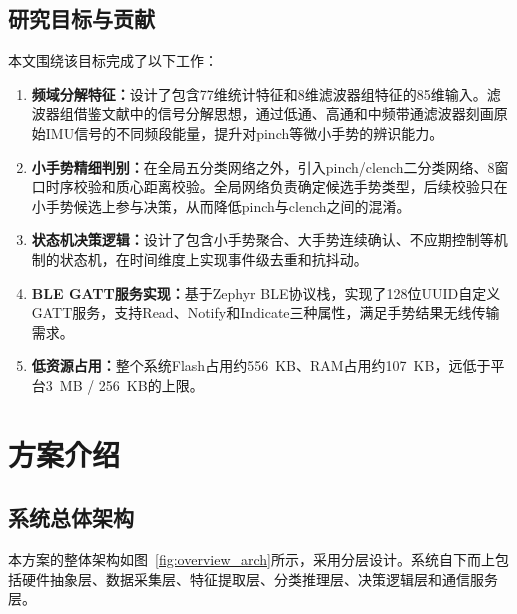 \documentclass[lettersize,journal]{IEEEtran}
\begin{document}
\subsection{研究目标与贡献}

本文围绕该目标完成了以下工作：

\begin{enumerate}[leftmargin=*]
    \item \textbf{频域分解特征：}设计了包含77维统计特征和8维滤波器组特征的85维输入。滤波器组借鉴文献\cite{xu2022enabling}中的信号分解思想，通过低通、高通和中频带通滤波器刻画原始IMU信号的不同频段能量，提升对pinch等微小手势的辨识能力。

    \item \textbf{小手势精细判别：}在全局五分类网络之外，引入pinch/clench二分类网络、8窗口时序校验和质心距离校验。全局网络负责确定候选手势类型，后续校验只在小手势候选上参与决策，从而降低pinch与clench之间的混淆。

    \item \textbf{状态机决策逻辑：}设计了包含小手势聚合、大手势连续确认、不应期控制等机制的状态机，在时间维度上实现事件级去重和抗抖动。

    \item \textbf{BLE GATT服务实现：}基于Zephyr BLE协议栈，实现了128位UUID自定义GATT服务，支持Read、Notify和Indicate三种属性，满足手势结果无线传输需求\cite{zephyr_ble}。

    \item \textbf{低资源占用：}整个系统Flash占用约556~KB、RAM占用约107~KB，远低于平台3~MB / 256~KB的上限。
\end{enumerate}

\vspace{0.5em}
\renewcommand{\contentsname}{目\quad 录}
\tableofcontents

\section{方案介绍}
\label{sec:overview}

\subsection{系统总体架构}

本方案的整体架构如图~\ref{fig:overview_arch}所示，采用分层设计。系统自下而上包括硬件抽象层、数据采集层、特征提取层、分类推理层、决策逻辑层和通信服务层。
\end{document}
